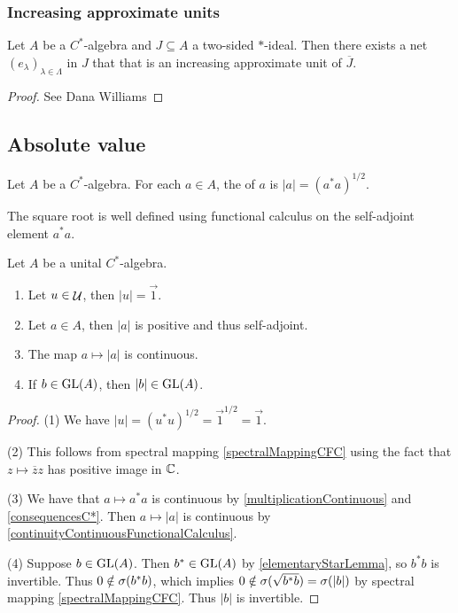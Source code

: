 \subsubsection{Increasing approximate units}
\begin{proposition} \label{approximateUnitInIdeal}
Let $A$ be a $C^*$-algebra and $J \subseteq A$ a two-sided $*$-ideal. Then there exists a net $(e_\lambda)_{\lambda\in\Lambda}$ in $J$ that that is an increasing approximate unit of $\overline{J}$.
\end{proposition}
\begin{proof}
See Dana Williams
\end{proof}

\subsection{Absolute value}
\begin{definition}
Let $A$ be a $C^*$-algebra. For each $a\in A$, the  of $a$ is $|a| = (a^*a)^{1/2}$.
\end{definition}
The square root is well defined using functional calculus on the self-adjoint element $a^*a$.

\begin{lemma} \label{propertiesAbsoluteValue}
Let $A$ be a unital $C^*$-algebra.
\begin{enumerate}
\item Let $u\in\mathop{\mathcal{U}}\nolimits$, then $|u| = \vec{1}$.
\item Let $a\in A$, then $|a|$ is positive and thus self-adjoint.
\item The map $a\mapsto |a|$ is continuous.
\item If $b\in \operatorname{GL}(A)$, then $|b|\in \operatorname{GL}(A)$.
\end{enumerate}
\end{lemma}
\begin{proof}
(1) We have $|u| = (u^*u)^{1/2} = \vec{1}^{1/2} = \vec{1}$.

(2) This follows from spectral mapping \ref{spectralMappingCFC} using the fact that $z\mapsto \overline{z}z$ has positive image in $\mathbb{C}$.

(3) We have that $a\mapsto a^*a$ is continuous by \ref{multiplicationContinuous} and \ref{consequencesC*}. Then $a\mapsto |a|$ is continuous by \ref{continuityContinuousFunctionalCalculus}.

(4) Suppose $b\in \operatorname{GL}(A)$. Then $b^*\in \operatorname{GL}(A)$ by \ref{elementaryStarLemma}, so $b^*b$ is invertible. Thus $0\notin \sigma(b^*b)$, which implies $0\notin \sigma(\sqrt{b^*b}) = \sigma(|b|)$ by spectral mapping \ref{spectralMappingCFC}. Thus $|b|$ is invertible.
\end{proof}

